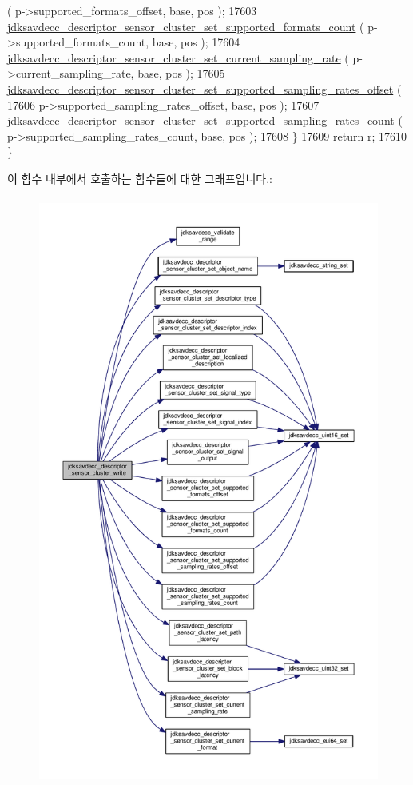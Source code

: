 \begin{DoxyCode}
      ( p->supported\_formats\_offset, base, pos );
17603         \hyperlink{group__descriptor__sensor__cluster_gaa153fdcb8403aedc943dad51be0dda11}{jdksavdecc\_descriptor\_sensor\_cluster\_set\_supported\_formats\_count}
      ( p->supported\_formats\_count, base, pos );
17604         \hyperlink{group__descriptor__sensor__cluster_gad341ee570253759b0d5cddb7306dc643}{jdksavdecc\_descriptor\_sensor\_cluster\_set\_current\_sampling\_rate}
      ( p->current\_sampling\_rate, base, pos );
17605         \hyperlink{group__descriptor__sensor__cluster_ga5b807a2f186c734c01212e809109bd04}{jdksavdecc\_descriptor\_sensor\_cluster\_set\_supported\_sampling\_rates\_offset}
      (
17606             p->supported\_sampling\_rates\_offset, base, pos );
17607         \hyperlink{group__descriptor__sensor__cluster_ga71e9a99bb7f289e59f91cfdaa507ebd4}{jdksavdecc\_descriptor\_sensor\_cluster\_set\_supported\_sampling\_rates\_count}
      ( p->supported\_sampling\_rates\_count, base, pos );
17608     \}
17609     \textcolor{keywordflow}{return} r;
17610 \}
\end{DoxyCode}


이 함수 내부에서 호출하는 함수들에 대한 그래프입니다.\+:
\nopagebreak
\begin{figure}[H]
\begin{center}
\leavevmode
\includegraphics[height=550pt]{group__descriptor__sensor__cluster_ga60e5159f644801f50824613757156857_cgraph}
\end{center}
\end{figure}


